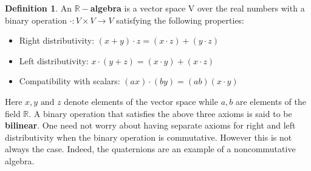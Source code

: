 \documentclass[11pt]{report}
\theoremstyle{plain}
\theoremstyle{definition}
\newtheorem{defn}{Definition}
\begin{document}
	\begin{defn}
		An $ \mathbb{R}-$\textbf{algebra} is a vector space V over the real numbers with a binary operation $ \cdot : V \times V \rightarrow V $ satisfying the following properties:
		\begin{itemize}
		\item Right distributivity: $(x+y) \cdot z = (x \cdot z) + (y \cdot z) $
		\item Left distributivity: $ x \cdot (y+z) = (x \cdot y)+(x \cdot z)$
		\item Compatibility with scalars: $ (ax)\cdot (by) = (ab) (x \cdot y) $
		\end{itemize}
		Here $ x , y \text{ and } z $ denote elements of the vector space while $ a , b $ are elements of the field $ \mathbb{R}. $ A binary operation that satisfies the above three axioms is said to be  \textbf{bilinear}. One need not worry about having separate axioms for right and left distributivity when the binary operation is commutative. However this is not always the case. Indeed, the quaternions are an example of a noncommutative algebra. 
	\end{defn}
	
\end{document}
